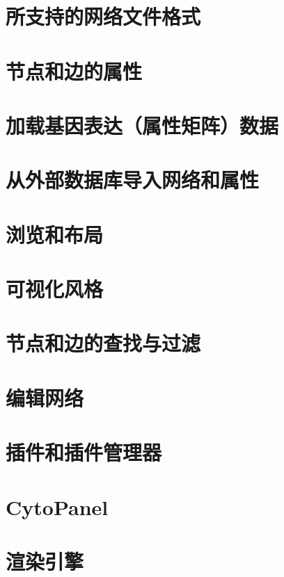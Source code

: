 \documentclass[a4paper, oneside]{book}
\begin{document}
\begin{CJK}{UTF8}{msyh}
\chapter{所支持的网络文件格式}


\chapter{节点和边的属性}


\chapter{加载基因表达（属性矩阵）数据}


\chapter{从外部数据库导入网络和属性}


\chapter{浏览和布局}


\chapter{可视化风格}


\chapter{节点和边的查找与过滤}


\chapter{编辑网络}


\chapter{插件和插件管理器}


\chapter{CytoPanel}


\chapter{渲染引擎}



\end{CJK}
\end{document}
